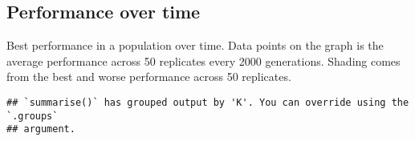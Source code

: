 \documentclass[]{book}
\newenvironment{Shaded}{\begin{snugshade}}{\end{snugshade}}
\newcommand{\DataTypeTok}[1]{\textcolor[rgb]{0.13,0.29,0.53}{#1}}
\newcommand{\KeywordTok}[1]{\textcolor[rgb]{0.13,0.29,0.53}{\textbf{#1}}}
\newcommand{\NormalTok}[1]{#1}
\newcommand{\OperatorTok}[1]{\textcolor[rgb]{0.81,0.36,0.00}{\textbf{#1}}}
\newcommand{\StringTok}[1]{\textcolor[rgb]{0.31,0.60,0.02}{#1}}
\begin{document}
\hypertarget{performance-over-time-16}{%
\subsection{Performance over time}\label{performance-over-time-16}}

Best performance in a population over time.
Data points on the graph is the average performance across 50 replicates every 2000 generations.
Shading comes from the best and worse performance across 50 replicates.

\begin{Shaded}
\end{Shaded}

\begin{verbatim}
## `summarise()` has grouped output by 'K'. You can override using the `.groups`
## argument.
\end{verbatim}
\end{document}
